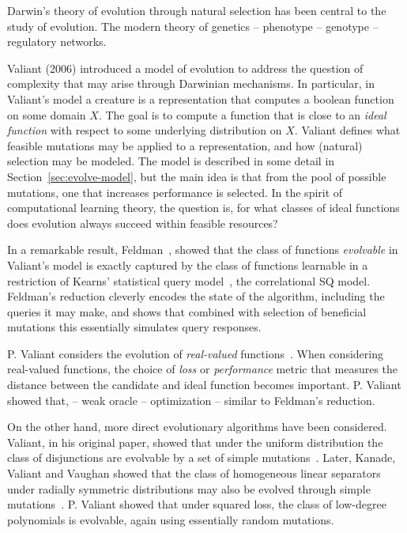 Darwin's theory of evolution through natural selection has been central to the
study of evolution. The modern theory of genetics  -- phenotype -- genotype --
regulatory networks. 

Valiant (2006) introduced a model of evolution to address the question of
complexity that may arise through Darwinian mechanisms. In particular, in
Valiant's model a creature is a representation that computes a boolean function
on some domain $X$. The goal is to compute a function that is close to an
\emph{ideal function} with respect to some underlying distribution on $X$.
Valiant defines what feasible mutations may be applied to a representation, and
how (natural) selection may be modeled. The model is described in some detail in
Section~\ref{sec:evolve-model}, but the main idea is that from the pool of
possible mutations, one that increases performance is selected. In the spirit of
computational learning theory, the question is, for what classes of ideal
functions does evolution always succeed within feasible resources?

In a remarkable result, Feldman~\cite{Feldman:2008}, showed that the class of
functions \emph{evolvable} in Valiant's model is exactly captured by the class
of functions learnable in a restriction of Kearns' statistical query
model~\cite{Kearns:1998}, the correlational SQ model. Feldman's reduction
cleverly encodes the state of the algorithm, including the queries it may make,
and shows that combined with selection of beneficial mutations this essentially
simulates query responses. 

P. Valiant considers the evolution of \emph{real-valued}
functions~\cite{Valiant:2012-reals}. When considering real-valued functions, the
choice of \emph{loss} or \emph{performance} metric that measures the distance
between the candidate and ideal function becomes important. P. Valiant showed
that,  -- weak oracle -- optimization -- similar to Feldman's reduction.

On the other hand, more direct evolutionary algorithms have been considered.
Valiant, in his original paper, showed that under the uniform distribution the
class of disjunctions are evolvable by a set of simple
mutations~\cite{Valiant:2009}. Later, Kanade, Valiant and Vaughan showed that
the class of homogeneous linear separators under radially symmetric
distributions may also be evolved through simple mutations~\cite{KVV:2010}. P.
Valiant showed that under squared loss, the class of low-degree polynomials is
evolvable, again using essentially random mutations.

